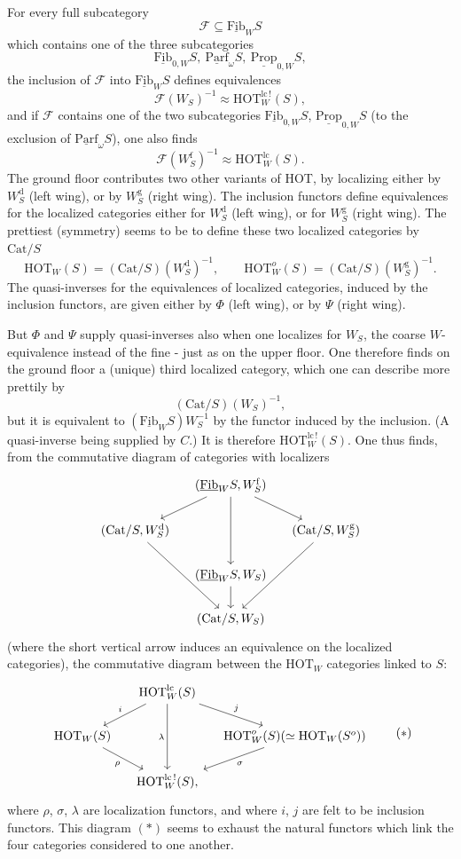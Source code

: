 \documentclass[11pt]{article}
\newcommand{\printedpage}[1]{\marginpar{\footnotesize p.~#1}}
\newcommand{\msp}[1]{\marginpar{\footnotesize [#1]}}
\newcommand{\Fib}{\underline{\mathrm{Fib}}}
\newcommand{\Parf}{\underline{\mathrm{Parf}}}
\newcommand{\Prop}{\underline{\mathrm{Prop}}}
\newcommand{\HOT}{\mathrm{HOT}}
\newcommand{\Cat}{\mathrm{Cat}}
\newcommand{\lcs}{\mathrm{lc}\,!}
\begin{document}
\printedpage{109}

\noindent\msp{page 177}
For every full subcategory
\[
\mathcal{F} \subseteq \Fib_W S
\]
which contains one of the three subcategories
\[
\Fib_{0,W}S,\ \Parf_\omega S,\ \Prop_{0,W}S,
\]
the inclusion of $\mathcal{F}$ into $\Fib_W S$ defines equivalences
\[
\mathcal{F}(W_S)^{-1} \approx \HOT^{\lcs}_W(S),
\]
and if $\mathcal{F}$ contains one of the two subcategories $\Fib_{0,W}S$, $\Prop_{0,W}S$ (to the exclusion of $\Parf_\omega S$), one also finds
\[
\mathcal{F}(W^{\mathrm{f}}_S)^{-1} \approx \HOT^{\mathrm{lc}}_W(S).
\]
The ground floor contributes two other variants of HOT, by localizing either by $W^{\mathrm{d}}_S$ (left wing), or by $W^{\mathrm{g}}_S$ (right wing). The inclusion functors define equivalences for the localized categories either for $W^{\mathrm{d}}_S$ (left wing), or for $W^{\mathrm{g}}_S$ (right wing). The prettiest (symmetry) seems to be to define these two localized categories by $\Cat/S$
\[
\HOT_W(S) = (\Cat/S)(W^{\mathrm{d}}_S)^{-1}, \qquad \HOT^{o}_W(S) = (\Cat/S)(W^{\mathrm{g}}_S)^{-1}.
\]
The quasi-inverses for the equivalences of localized categories, induced by the inclusion functors, are given either by $\Phi$ (left wing), or by $\Psi$ (right wing).

But $\Phi$ and $\Psi$ supply quasi-inverses also when one localizes for $W_S$, the coarse $W$-equivalence instead of the fine - just as on the upper floor. One therefore finds on the ground floor a (unique) third localized category, which one can describe more prettily by
\[
(\Cat/S)(W_S)^{-1},
\]
but it is equivalent to $(\Fib_W S)W_S^{-1}$ by the
\msp{page 178}
functor induced by the inclusion. (A quasi-inverse being supplied by $C$.) It is therefore $\HOT^{\lcs}_W(S)$. One thus finds, from the commutative diagram of categories with localizers
\[
\begin{tikzcd}[column sep=small]
 & (\Fib_W S, W^{\mathrm{f}}_S) \arrow[dl] \arrow[dd] \arrow[dr] & \\
(\Cat/S, W^{\mathrm{d}}_S) \arrow[ddr] & & (\Cat/S, W^{\mathrm{g}}_S) \arrow[ddl] \\
 & (\Fib_W S, W_S) \arrow[d] & \\
 & (\Cat/S, W_S) &
\end{tikzcd}
\]
\printedpage{110}
(where the short vertical arrow induces an equivalence on the localized categories), the commutative diagram between the $\HOT_W$ categories linked to $S$:
\[
\begin{tikzcd}[column sep=small]
 & \HOT^{\mathrm{lc}}_W(S) \arrow[dl, "i"'] \arrow[dd, "\lambda"'] \arrow[dr, "j"] & \\
\HOT_W(S) \arrow[dr, "\rho"'] & & \HOT^{o}_W(S)(\simeq \HOT_W(S^{o})) \arrow[dl, "\sigma"] \\
 & \HOT^{\lcs}_W(S), &
\end{tikzcd}
\tag*{$(\ast)$}
\]
where $\rho$, $\sigma$, $\lambda$ are localization functors, and where $i$, $j$ are felt to be inclusion functors. This diagram $(\ast)$ seems to exhaust the natural functors which link the four categories considered to one another.
\end{document}
